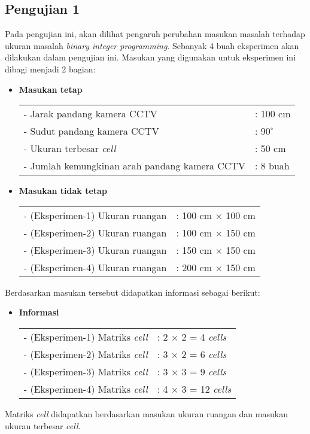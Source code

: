 \subsection{Pengujian 1}
Pada pengujian ini, akan dilihat pengaruh perubahan masukan masalah terhadap ukuran masalah \textit{binary integer programming}. Sebanyak 4 buah eksperimen akan dilakukan dalam pengujian ini. Masukan yang digunakan untuk eksperimen ini dibagi menjadi 2 bagian:
\begin{itemize}
	\item \textbf{Masukan tetap}\\
	\begin{tabular}{ll}
		- Jarak pandang kamera CCTV &: 100 cm\\
		- Sudut pandang kamera CCTV &: $90^\circ$\\
		- Ukuran terbesar \textit{cell} &: 50 cm\\
		- Jumlah kemungkinan arah pandang kamera CCTV &: 8 buah\\
	\end{tabular}
	\item \textbf{Masukan tidak tetap}\\
	\begin{tabular}{ll}
		- (Eksperimen-1) Ukuran ruangan &: 100 cm $\times$ 100 cm\\
		- (Eksperimen-2) Ukuran ruangan &: 100 cm $\times$ 150 cm\\
		- (Eksperimen-3) Ukuran ruangan &: 150 cm $\times$ 150 cm\\
		- (Eksperimen-4) Ukuran ruangan &: 200 cm $\times$ 150 cm\\
	\end{tabular}
\end{itemize}
Berdasarkan masukan tersebut didapatkan informasi sebagai berikut:
\begin{itemize}
	\item \textbf{Informasi}\\
	\begin{tabular}{ll}
		- (Eksperimen-1) Matriks \textit{cell} &: 2 $\times$ 2 = 4 \textit{cells}\\
		- (Eksperimen-2) Matriks \textit{cell} &: 3 $\times$ 2 = 6 \textit{cells}\\
		- (Eksperimen-3) Matriks \textit{cell} &: 3 $\times$ 3 = 9 \textit{cells}\\
		- (Eksperimen-4) Matriks \textit{cell} &: 4 $\times$ 3 = 12 \textit{cells}\\
	\end{tabular}
\end{itemize}
Matriks \textit{cell} didapatkan berdasarkan masukan ukuran ruangan dan masukan ukuran terbesar \textit{cell}.

